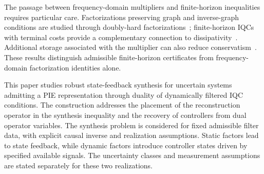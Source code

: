 The passage between frequency-domain multipliers and finite-horizon
inequalities requires particular care. Factorizations preserving graph and
inverse-graph conditions are studied through doubly-hard
factorizations~\cite{carrasco2018equivalence}; finite-horizon IQCs with terminal
costs provide a complementary connection to
dissipativity~\cite{scherer2018dynamicdissipation}.
Additional storage associated with the multiplier can also reduce
conservatism~\cite{magicalhiddenenergy,hu}.
These results distinguish admissible finite-horizon certificates from
frequency-domain factorization identities alone.

This paper studies robust state-feedback synthesis for uncertain systems
admitting a PIE representation through duality of dynamically filtered IQC
conditions. The construction addresses the placement of the reconstruction
operator in the synthesis inequality and the recovery of controllers from
dual operator variables. The synthesis problem is considered for fixed
admissible filter data, with explicit causal inverse and realization
assumptions. Static factors lead to state feedback, while dynamic factors
introduce controller states driven by specified available signals. The
uncertainty classes and measurement assumptions are stated separately for
these two realizations.
